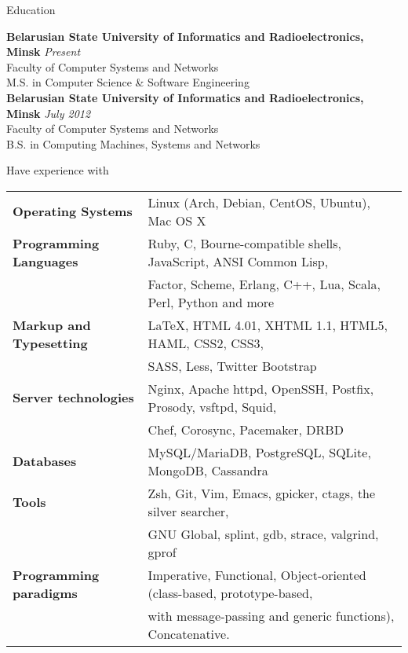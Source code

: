 \documentclass{resume} %
\begin{document}

\begin{rSection}{Education}

{\bf Belarusian State University of Informatics and Radioelectronics, Minsk} \hfill {\em Present} \\ 
Faculty of Computer Systems and Networks \\
M.S. in Computer Science \& Software Engineering \smallskip \\
{\bf Belarusian State University of Informatics and Radioelectronics, Minsk} \hfill {\em July 2012} \\ 
Faculty of Computer Systems and Networks \\
B.S. in Computing Machines, Systems and Networks \\

\end{rSection}


\begin{rSection}{Have experience with}

\begin{tabular}{ @{} >{\bfseries}l @{\hspace{6ex}} l }
Operating Systems     & Linux (Arch, Debian, CentOS, Ubuntu), Mac OS X \smallskip \\
Programming Languages & Ruby, C, Bourne-compatible shells, JavaScript, ANSI Common Lisp, \\
                      & Factor, Scheme, Erlang, C++, Lua, Scala, Perl, Python and more\smallskip \\
Markup and Typesetting & \LaTeX, HTML 4.01, XHTML 1.1, HTML5, HAML, CSS2, CSS3, \\
                       & SASS, Less, Twitter Bootstrap \smallskip \\
Server technologies   & Nginx, Apache httpd, OpenSSH, Postfix, Prosody, vsftpd, Squid, \\
                      & Chef, Corosync, Pacemaker, DRBD \smallskip \\
Databases & MySQL/MariaDB, PostgreSQL, SQLite, MongoDB, Cassandra \smallskip \\
Tools & Zsh, Git, Vim, Emacs, gpicker, ctags, the silver searcher, \\
      &    GNU Global, splint, gdb, strace, valgrind, gprof \smallskip \\
Programming paradigms & Imperative, Functional, Object-oriented (class-based, prototype-based, \\
                      & with message-passing and generic functions), Concatenative.
\end{tabular}

\end{rSection}
\end{document}

